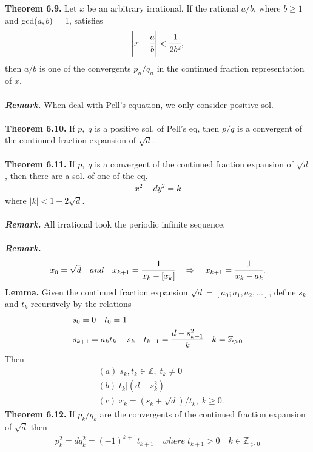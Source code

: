 \documentclass[a4paper,10pt]{article}
\begin{document}
\newpage
\textbf{Theorem 6.9.} Let $x$ be an arbitrary irrational. If the rational $a/b$, where $b\geq 1$ and gcd($a,b$) = 1, satisfies
\begin{align}
\left|x-\cfrac{a}{b}\right|<\cfrac{1}{2b^{2}},
\end{align}
then $a/b$ is one of the convergents $p_{n}/q_{n}$ in the continued fraction representation of $x$. \\ \\
\textit{\textbf{Remark.}} When deal with Pell's equation, we only consider positive sol. \\ \\
\textbf{Theorem 6.10.} If $p, \;q$ is a positive sol. of Pell's eq, then $p/q$ is a convergent of the continued fraction expansion of $\sqrt{d}$. \\ \\
\textbf{Theorem 6.11.} If $p, \;q$ is a convergent of the continued fraction expansion of $\sqrt{d}$, then there are a sol. of one of the eq.
\begin{align}
x^{2}-dy^{2}=k
\end{align}
where $|k|<1+2\sqrt{d}$. \\ \\
\textit{\textbf{Remark.}} All irrational took the periodic infinite sequence. \\ \\
\textit{\textbf{Remark.}}
\begin{align}
x_{0}=\sqrt{d} \quad and \quad x_{k+1}=\cfrac{1}{x_{k}-[x_{k}]} \quad \Rightarrow \quad x_{k+1}=\cfrac{1}{x_{k}-a_{k}}.
\end{align}
\textbf{Lemma.} Given the continued fraction expansion $\sqrt{d}=[a_{0};a_{1},a_{2},\ldots]$, define $s_{k}$ and $t_{k}$ recursively by the relations
\begin{align}
& s_{0}=0 \quad t_{0}=1 \\
& s_{k+1}=a_{k}t_{k}-s_{k} \quad t_{k+1}=\cfrac{d-s_{k+1}^{2}}{k} \quad k=\mathbb{Z}_{>0}
\end{align}
Then
\begin{align}
&(a) \; s_{k}, t_{k}\in \mathbb{Z}, \; t_{k}\neq 0 \\
&(b) \; t_{k}|(d-s_{k}^{2}) \\
&(c) \; x_{k}=(s_{k}+\sqrt{d})/t_{k}, \; k\geq 0.
\end{align}
\textbf{Theorem 6.12.} If $p_{k}/q_{k}$ are the convergents of the continued fraction expansion of $\sqrt{d}$ then 
\begin{align}
p_{k}^{2}=dq_{k}^{2}=(-1)^{k+1}t_{k+1} \quad where \; t_{k+1}>0 \quad k\in\mathbb{Z}_{>0}
\end{align}
\end{document}
